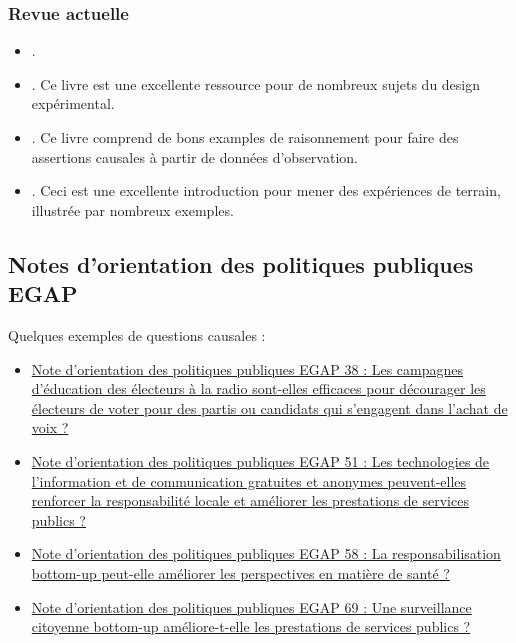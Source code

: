 \documentclass[
  12pt,
]{book}
\begin{document}
\hypertarget{revue-actuelle}{%
\subsubsection{Revue actuelle}\label{revue-actuelle}}

\begin{itemize}
\item
  \autocite{brady2008causation}.
\item
  \autocite[Chapitre 1]{gerber_field_2012}. Ce livre est une excellente ressource pour de nombreux sujets du design expérimental.
\item
  \autocite[Chapitre 1]{morgan_counterfactuals_2007}. Ce livre comprend de bons examples de raisonnement pour faire des assertions causales à partir de données d'observation.
\item
  \autocite{glennerster_running_2013}. Ceci est une excellente introduction pour mener des expériences de terrain, illustrée par nombreux exemples.
\end{itemize}

\hypertarget{notes-dorientation-des-politiques-publiques-egap}{%
\subsection{Notes d'orientation des politiques publiques EGAP}\label{notes-dorientation-des-politiques-publiques-egap}}

Quelques exemples de questions causales :

\begin{itemize}
\item
  \href{https://egap.org/resource/brief-38-diminishing-the-effectiveness-of-vote-buying-through-voter-education/}{Note d'orientation des politiques publiques EGAP 38 : Les campagnes d'éducation des électeurs à la radio sont-elles efficaces pour décourager les électeurs de voter pour des partis ou candidats qui s'engagent dans l'achat de voix ?}
\item
  \href{https://egap.org/resource/does-information-technology-improve-public-service-delivery-lessons-from-uganda/}{Note d'orientation des politiques publiques EGAP 51 : Les technologies de l'information et de communication gratuites et anonymes peuvent-elles renforcer la responsabilité locale et améliorer les prestations de services publics ?}
\item
  \href{https://egap.org/resource/does-bottom-up-accountability-work-evidence-from-uganda/}{Note d'orientation des politiques publiques EGAP 58 : La responsabilisation bottom-up peut-elle améliorer les perspectives en matière de santé ?}
\item
  \href{https://egap.org/resource/brief-69-bottom-up-accountability-and-public-service-provision-in-brazil/}{Note d'orientation des politiques publiques EGAP 69 : Une surveillance citoyenne bottom-up améliore-t-elle les prestations de services publics ?}
\end{itemize}
\end{document}
